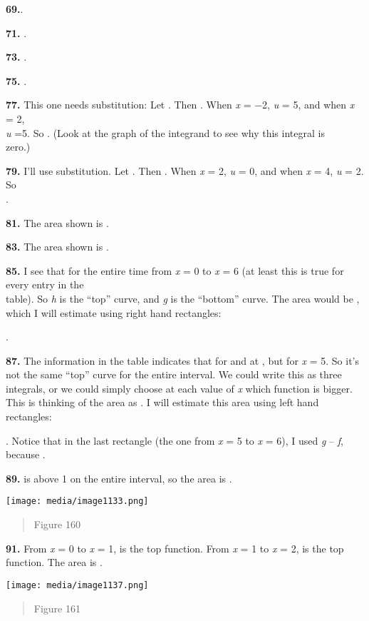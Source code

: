 \textbf{69.}.

\textbf{71.} .

\textbf{73.} .

\textbf{75.} .

\textbf{77.} This one needs substitution: Let . Then . When \emph{x} =
−2, \emph{u} = 5, and when \emph{x} = 2,\\
\emph{u} =5. So . (Look at the graph of the integrand to see why this
integral is\\
zero.)

\textbf{79.} I'll use substitution. Let . Then . When \emph{x} = 2,
\emph{u} = 0, and when \emph{x} = 4, \emph{u} = 2. So\\
.

\textbf{81.} The area shown is .

\textbf{83.} The area shown is .

\textbf{85.} I see that for the entire time from \emph{x} = 0 to
\emph{x} = 6 (at least this is true for every entry in the\\
table). So \emph{h} is the ``top'' curve, and \emph{g} is the ``bottom''
curve. The area would be , which I will estimate using right hand
rectangles:

.

\textbf{87.} The information in the table indicates that for and at ,
but for \emph{x} = 5. So it's not the same ``top'' curve for the entire
interval. We could write this as three integrals, or we could simply
choose at each value of \emph{x} which function is bigger. This is
thinking of the area as . I will estimate this area using left hand
rectangles:

. Notice that in the last rectangle (the one from \emph{x} = 5 to
\emph{x} = 6), I used \emph{g} -- \emph{f}, because .

\textbf{89.} is above 1 on the entire interval, so the area is .

\texttt{[image: media/image1133.png]}

\begin{quote}
Figure 160
\end{quote}

\textbf{91.} From \emph{x} = 0 to \emph{x} = 1, is the top function.
From \emph{x} = 1 to \emph{x} = 2, is the top function. The area is .

\texttt{[image: media/image1137.png]}

\begin{quote}
Figure 161
\end{quote}

